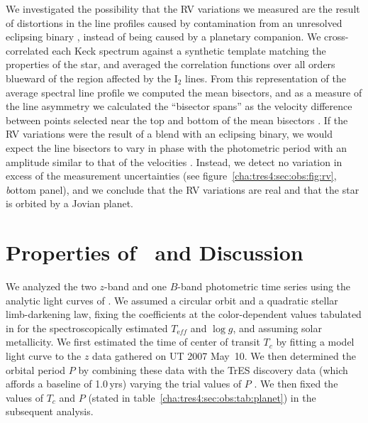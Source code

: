 We investigated the possibility that the RV variations we measured are the
result of distortions in the line profiles caused by contamination from an
unresolved eclipsing binary \citep{Santos_Mayor_Naef:aa:2002a, Torres_Konacki_Sasselov:apj:2005a}, instead of being caused by a planetary companion. We cross-correlated
each Keck spectrum against a synthetic template matching the properties of the
star, and averaged the correlation functions over all orders blueward of the
region affected by the I$_2$ lines. From this representation of the average
spectral line profile we computed the mean bisectors, and as a measure of the
line asymmetry we calculated the ``bisector spans'' as the velocity difference
between points selected near the top and bottom of the mean bisectors
\citep{Torres_Konacki_Sasselov:apj:2005a}. If the RV variations were the result of a blend with an eclipsing
binary, we would expect the line bisectors to vary in phase with the
photometric period with an amplitude similar to that of the velocities
\citep{Queloz_Henry_Sivan:aa:2001a, Mandushev_Torres_Latham:apj:2005a}. Instead, we detect no variation in excess of the
measurement uncertainties (see figure~\ref{cha:tres4:sec:obs:fig:rv}, {\textit bottom panel}), and we conclude
that the RV variations are real and that the star is orbited by a Jovian
planet.

\section{Properties of \tresFour\ and Discussion}\label{cha:tres4:sec:dis}

We analyzed the two $z$-band and one $B$-band photometric time series using the
analytic light curves of \citet{Mandel_Agol:apjl:2002a}. We assumed a circular orbit and a
quadratic stellar limb-darkening law, fixing the coefficients at the
color-dependent values tabulated in \citet{Claret:aa:2000a, Claret:aa:2004a} for the
spectroscopically estimated $T_{\mathrm eff}$ and $\log g$, and assuming solar
metallicity. We first estimated the time of center of transit $T_c$ by fitting
a model light curve to the $z$ data gathered on UT 2007 May~10. We then determined the orbital period $P$ by combining these
data with the TrES discovery data (which affords a baseline of 1.0\,yrs)
varying the trial values of $P$
. We then fixed the values of $T_c$ and $P$
(stated in table~\ref{cha:tres4:sec:obs:tab:planet}) in the subsequent analysis.

